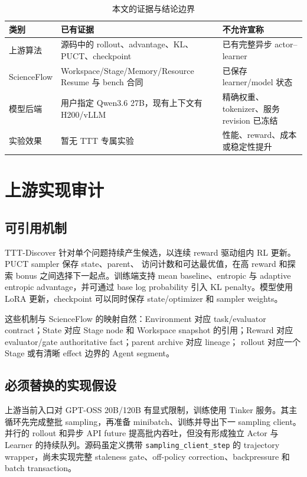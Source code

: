 \documentclass[UTF8,11pt,a4paper]{ctexart}
\newcommand{\code}[1]{\texttt{#1}}
\begin{document}
\begin{table}[htbp]
  \centering
  \caption{本文的证据与结论边界}
  \begin{tabularx}{\textwidth}{L{2.7cm}YY}
    \toprule
    类别 & 已有证据 & 不允许宣称 \\
    \midrule
    上游算法 & 源码中的 rollout、advantage、KL、PUCT、checkpoint & 已有完整异步 actor--learner \\
    ScienceFlow & Workspace/Stage/Memory/Resource Resume 与 bench 合同 & 已保存 learner/model 状态 \\
    模型后端 & 用户指定 Qwen3.6 27B，现有上下文有 H200/vLLM & 精确权重、tokenizer、服务 revision 已冻结 \\
    实验效果 & 暂无 TTT 专属实验 & 性能、reward、成本或稳定性提升 \\
    \bottomrule
  \end{tabularx}
\end{table}

\section{上游实现审计}

\subsection{可引用机制}

TTT-Discover 针对单个问题持续产生候选，以连续 reward 驱动组内 RL 更新。PUCT sampler 保存 state、parent、
访问计数和可达最优值，在高 reward 和探索 bonus 之间选择下一起点。训练端支持 mean baseline、entropic 与
adaptive entropic advantage，并可通过 base log probability 引入 KL penalty。模型使用 LoRA 更新，checkpoint
可以同时保存 state/optimizer 和 sampler weights。

这些机制与 ScienceFlow 的映射自然：Environment 对应 task/evaluator contract；State 对应 Stage node 和
Workspace snapshot 的引用；Reward 对应 evaluator/gate authoritative fact；parent archive 对应 lineage；
rollout 对应一个 Stage 或有清晰 effect 边界的 Agent segment。

\subsection{必须替换的实现假设}

上游当前入口对 GPT-OSS 20B/120B 有显式限制，训练使用 Tinker 服务。其主循环先完成整批 sampling，再准备
minibatch、训练并导出下一 sampling client。并行的 rollout 和异步 API future 提高批内吞吐，但没有形成独立
Actor 与 Learner 的持续队列。源码虽定义携带 \code{sampling\_client\_step} 的 trajectory wrapper，尚未实现完整
staleness gate、off-policy correction、backpressure 和 batch transaction。
\end{document}
